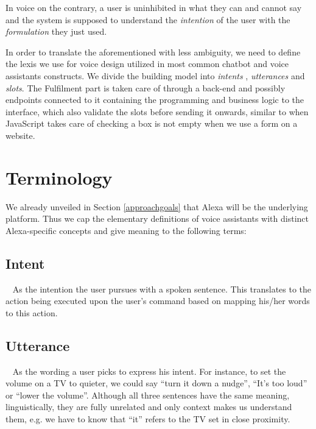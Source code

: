 %  

In voice on the contrary, a user is uninhibited in what they can and cannot say and the system is supposed to understand the \textit{intention} %
of the user with the \textit{formulation} %
they just used.

In order to translate the aforementioned with less ambiguity, we need to define the lexis we use for voice design utilized in most common chatbot and voice assistants constructs. 
We divide the building model into \textit{intents}%
, \textit{utterances} %
 and \textit{slots}. %
The Fulfilment part is taken care of through a back-end and possibly endpoints connected to it containing the programming and business logic to the interface, which also validate the slots before sending it onwards, similar to when JavaScript takes care of checking a box is not empty when we use a form on %
a website. %

\section{Terminology}
We already unveiled in Section \ref{approachgoals} that Alexa will be the underlying platform. Thus we cap the elementary definitions of voice assistants with distinct Alexa-specific concepts and give meaning to the following terms: 

	\subsection*{Intent}~\label{intents}
	As the intention the user pursues with a spoken sentence. This translates to the action being executed upon the user's command based on mapping his/her words to this action.
	
	\subsection*{Utterance}~\label{utterances}
	As the wording a user picks to express his intent. For instance, to set the volume on a TV to quieter, we could say ``turn it down a nudge'', ``It's too loud'' or ``lower the volume''. Although all three sentences have the same meaning, linguistically, they are fully unrelated and only context makes us understand them, e.g. we have to know that ``it'' refers to the TV set in close proximity.
	
